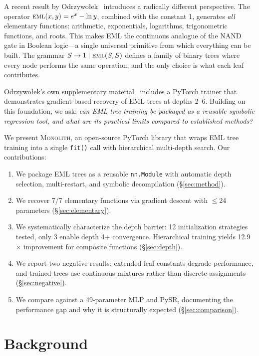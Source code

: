 \documentclass[11pt,a4paper]{article}
\newcommand{\eml}{\textsc{eml}}
\newcommand{\monolith}{\textsc{Monolith}}
\begin{document}
A recent result by Odrzywołek~\citep{odrzywołek2026eml} introduces a radically different perspective.
The operator $\eml(x, y) = e^x - \ln y$, combined with the constant 1, generates \emph{all} elementary functions: arithmetic, exponentials, logarithms, trigonometric functions, and roots.
This makes EML the continuous analogue of the NAND gate in Boolean logic---a single universal primitive from which everything can be built.
The grammar $S \to 1 \mid \eml(S, S)$ defines a family of binary trees where every node performs the same operation, and the only choice is what each leaf contributes.

Odrzywołek's own supplementary material~\citep{odrzywołek2026eml} includes a PyTorch trainer that demonstrates gradient-based recovery of EML trees at depths 2--6.
Building on this foundation, we ask: \emph{can EML tree training be packaged as a reusable symbolic regression tool, and what are its practical limits compared to established methods?}

We present \monolith, an open-source PyTorch library that wraps EML tree training into a single \texttt{fit()} call with hierarchical multi-depth search.
Our contributions:

\begin{enumerate}
    \item We package EML trees as a reusable \texttt{nn.Module} with automatic depth selection, multi-restart, and symbolic decompilation (\S\ref{sec:method}).
    \item We recover 7/7 elementary functions via gradient descent with $\leq$24 parameters (\S\ref{sec:elementary}).
    \item We systematically characterize the depth barrier: 12 initialization strategies tested, only 3 enable depth 4+ convergence. Hierarchical training yields 12.9$\times$ improvement for composite functions (\S\ref{sec:depth}).
    \item We report two negative results: extended leaf constants degrade performance, and trained trees use continuous mixtures rather than discrete assignments (\S\ref{sec:negative}).
    \item We compare against a 49-parameter MLP and PySR, documenting the performance gap and why it is structurally expected (\S\ref{sec:comparison}).
\end{enumerate}

\section{Background}
\label{sec:background}
\end{document}
